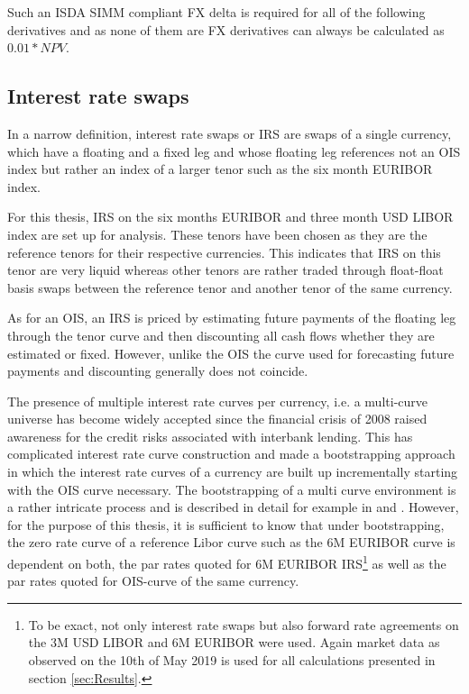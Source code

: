 \documentclass[../Thesis_AHoecherl.tex]{subfiles}
\begin{document}
    Such an \gls{ISDA SIMM} compliant FX delta is required for all of the following derivatives and as none of them are FX derivatives can always be calculated as $0.01 * NPV$.

    \subsection{Interest rate swaps}

    In a narrow definition, interest rate swaps or \gls{IRS} are swaps of a single currency, which have a floating and a fixed leg and whose floating leg references not an \gls{OIS} index but rather an index of a larger tenor such as the six month \gls{EURIBOR} index.

    For this thesis, \gls{IRS} on the six months \gls{EURIBOR} and three month USD \gls{LIBOR} index are set up for analysis.
    These tenors have been chosen as they are the reference tenors for their respective currencies. 
    This indicates that \gls{IRS} on this tenor are very liquid whereas other tenors are rather traded through float-float basis swaps between the reference tenor and another tenor of the same currency.

    As for an \gls{OIS}, an \gls{IRS} is priced by estimating future payments of the floating leg through the tenor curve and then discounting all cash flows whether they are estimated or fixed.
    However, unlike the \gls{OIS} the curve used for forecasting future payments and discounting generally does not coincide.

    The presence of multiple interest rate curves per currency, i.e. a multi-curve universe has become widely accepted since the financial crisis of 2008 raised awareness for the credit risks associated with interbank lending.
    This has complicated interest rate curve construction and made a bootstrapping approach in which the interest rate curves of a currency are built up incrementally starting with the \gls{OIS} curve necessary.
    The bootstrapping of a multi curve environment is a rather intricate process and is described in detail for example in \cite{ametrano2013everything} and \cite{brugger2018valuation}.
    However, for the purpose of this thesis, it is sufficient to know that under bootstrapping, the zero rate curve of a reference Libor curve such as the 6M \gls{EURIBOR} curve is dependent on both, the par rates quoted for 6M \gls{EURIBOR} \gls{IRS}\footnote{To be exact, not only interest rate swaps but also forward rate agreements on the 3M USD \gls{LIBOR} and 6M \gls{EURIBOR} were used. Again market data as observed on the 10th of May 2019 is used for all calculations presented in section \ref{sec:Results}.} as well as the par rates quoted for \gls{OIS}-curve of the same currency.
\end{document}
